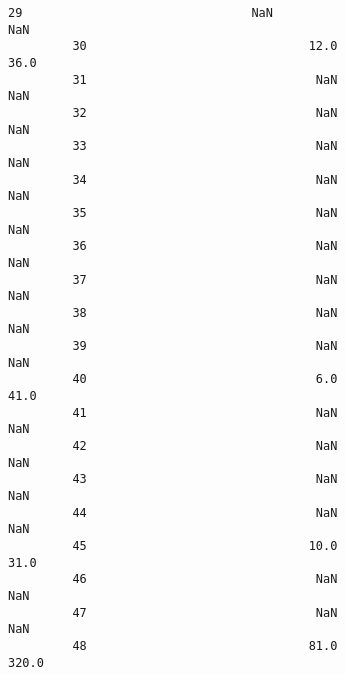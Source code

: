 \documentclass[11pt]{article}
\begin{document}
\begin{Verbatim}[commandchars=\\\{\}]
         29                                NaN                                    NaN   
         30                               12.0                                   36.0   
         31                                NaN                                    NaN   
         32                                NaN                                    NaN   
         33                                NaN                                    NaN   
         34                                NaN                                    NaN   
         35                                NaN                                    NaN   
         36                                NaN                                    NaN   
         37                                NaN                                    NaN   
         38                                NaN                                    NaN   
         39                                NaN                                    NaN   
         40                                6.0                                   41.0   
         41                                NaN                                    NaN   
         42                                NaN                                    NaN   
         43                                NaN                                    NaN   
         44                                NaN                                    NaN   
         45                               10.0                                   31.0   
         46                                NaN                                    NaN   
         47                                NaN                                    NaN   
         48                               81.0                                  320.0   
         

\end{Verbatim}
\end{document}
